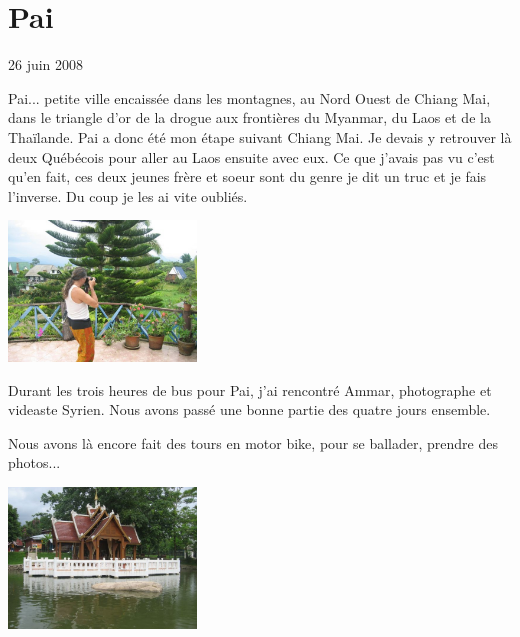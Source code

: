 \section{Pai}

26 juin 2008

\begin{multicols}{2}

Pai... petite ville encaissée dans les montagnes, au Nord Ouest de Chiang Mai, dans le triangle d'or de la drogue aux frontières du Myanmar, du Laos et de la Thaïlande. Pai a donc été mon étape suivant Chiang Mai. Je devais y retrouver là deux Québécois pour aller au Laos ensuite avec eux. Ce que j'avais pas vu c'est qu'en fait, ces deux jeunes frère et soeur sont du genre je dit un truc et je fais l'inverse. Du coup je les ai vite oubliés.

\smallbreak
\hspace*{-0.65cm}
\includegraphics[width=5cm]{articles/Pai/1214286262syiV.jpg}
\smallbreak

Durant les trois heures de bus pour Pai, j'ai rencontré Ammar, photographe et videaste Syrien. Nous avons passé une bonne partie des quatre jours ensemble.

Nous avons là encore fait des tours en motor bike, pour se ballader, prendre des photos...


\smallbreak
\hspace*{-0.65cm}
\includegraphics[width=5cm]{articles/Pai/1214286159uUtC.jpg}
\smallbreak


\end{multicols}
